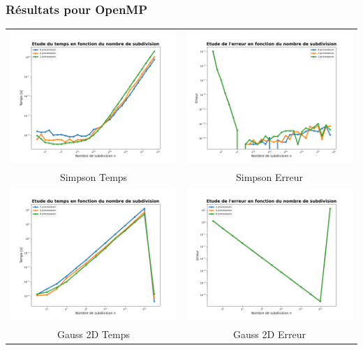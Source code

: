 \documentclass[10pt]{beamer}
\begin{document}
\begin{frame}
    \frametitle{Résultats pour OpenMP}
        \small
    \begin{tabular}{cc}
        \includegraphics[width=0.45\linewidth]{../Images/time_simp_Op_MP.png} &
        \includegraphics[width=0.45\linewidth]{../Images/error_simp_Op_MP.png} \\
        Simpson Temps & Simpson Erreur \\
        \includegraphics[width=0.45\linewidth]{../Images/time_gauss_Op_MP.png} &
        \includegraphics[width=0.45\linewidth]{../Images/error_gauss_Op_MP.png} \\
        Gauss 2D Temps & Gauss 2D Erreur \\
    \end{tabular}
        
\end{frame}
\end{document}
